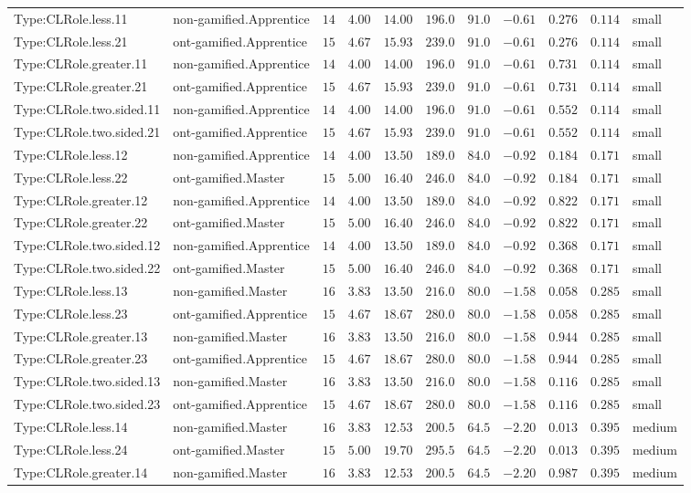 \documentclass[6pt,a4paper]{article}
\begin{document}
{\begin{longtable}{llrrrrrrrrl}
Type:CLRole.less.11&non-gamified.Apprentice&$14$&$4.00$&$14.00$&$ 196.0$&$ 91.0$&$-0.61$&$0.276$&$0.114$&small\tabularnewline
Type:CLRole.less.21&ont-gamified.Apprentice&$15$&$4.67$&$15.93$&$ 239.0$&$ 91.0$&$-0.61$&$0.276$&$0.114$&small\tabularnewline
Type:CLRole.greater.11&non-gamified.Apprentice&$14$&$4.00$&$14.00$&$ 196.0$&$ 91.0$&$-0.61$&$0.731$&$0.114$&small\tabularnewline
Type:CLRole.greater.21&ont-gamified.Apprentice&$15$&$4.67$&$15.93$&$ 239.0$&$ 91.0$&$-0.61$&$0.731$&$0.114$&small\tabularnewline
Type:CLRole.two.sided.11&non-gamified.Apprentice&$14$&$4.00$&$14.00$&$ 196.0$&$ 91.0$&$-0.61$&$0.552$&$0.114$&small\tabularnewline
Type:CLRole.two.sided.21&ont-gamified.Apprentice&$15$&$4.67$&$15.93$&$ 239.0$&$ 91.0$&$-0.61$&$0.552$&$0.114$&small\tabularnewline
Type:CLRole.less.12&non-gamified.Apprentice&$14$&$4.00$&$13.50$&$ 189.0$&$ 84.0$&$-0.92$&$0.184$&$0.171$&small\tabularnewline
Type:CLRole.less.22&ont-gamified.Master&$15$&$5.00$&$16.40$&$ 246.0$&$ 84.0$&$-0.92$&$0.184$&$0.171$&small\tabularnewline
Type:CLRole.greater.12&non-gamified.Apprentice&$14$&$4.00$&$13.50$&$ 189.0$&$ 84.0$&$-0.92$&$0.822$&$0.171$&small\tabularnewline
Type:CLRole.greater.22&ont-gamified.Master&$15$&$5.00$&$16.40$&$ 246.0$&$ 84.0$&$-0.92$&$0.822$&$0.171$&small\tabularnewline
Type:CLRole.two.sided.12&non-gamified.Apprentice&$14$&$4.00$&$13.50$&$ 189.0$&$ 84.0$&$-0.92$&$0.368$&$0.171$&small\tabularnewline
Type:CLRole.two.sided.22&ont-gamified.Master&$15$&$5.00$&$16.40$&$ 246.0$&$ 84.0$&$-0.92$&$0.368$&$0.171$&small\tabularnewline
Type:CLRole.less.13&non-gamified.Master&$16$&$3.83$&$13.50$&$ 216.0$&$ 80.0$&$-1.58$&$0.058$&$0.285$&small\tabularnewline
Type:CLRole.less.23&ont-gamified.Apprentice&$15$&$4.67$&$18.67$&$ 280.0$&$ 80.0$&$-1.58$&$0.058$&$0.285$&small\tabularnewline
Type:CLRole.greater.13&non-gamified.Master&$16$&$3.83$&$13.50$&$ 216.0$&$ 80.0$&$-1.58$&$0.944$&$0.285$&small\tabularnewline
Type:CLRole.greater.23&ont-gamified.Apprentice&$15$&$4.67$&$18.67$&$ 280.0$&$ 80.0$&$-1.58$&$0.944$&$0.285$&small\tabularnewline
Type:CLRole.two.sided.13&non-gamified.Master&$16$&$3.83$&$13.50$&$ 216.0$&$ 80.0$&$-1.58$&$0.116$&$0.285$&small\tabularnewline
Type:CLRole.two.sided.23&ont-gamified.Apprentice&$15$&$4.67$&$18.67$&$ 280.0$&$ 80.0$&$-1.58$&$0.116$&$0.285$&small\tabularnewline
Type:CLRole.less.14&non-gamified.Master&$16$&$3.83$&$12.53$&$ 200.5$&$ 64.5$&$-2.20$&$0.013$&$0.395$&medium\tabularnewline
Type:CLRole.less.24&ont-gamified.Master&$15$&$5.00$&$19.70$&$ 295.5$&$ 64.5$&$-2.20$&$0.013$&$0.395$&medium\tabularnewline
Type:CLRole.greater.14&non-gamified.Master&$16$&$3.83$&$12.53$&$ 200.5$&$ 64.5$&$-2.20$&$0.987$&$0.395$&medium\tabularnewline

\end{longtable}}
\end{document}
